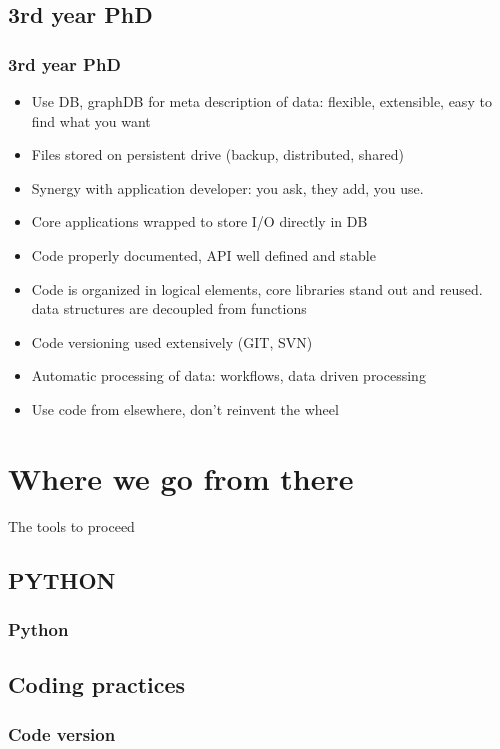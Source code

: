 \documentclass[14pt]{beamer}
\begin{document}
\subsection{3rd year PhD}
\begin{frame}
\frametitle{3rd year PhD}
\begin{itemize}
\item Use DB, graphDB for meta description of data: flexible, extensible, easy to find what you want
\item Files stored on persistent drive (backup, distributed, shared)
\item Synergy with application developer: you ask, they add, you use.
\item Core applications wrapped to store I/O directly in DB
\item Code properly documented, API well defined and stable
\end{itemize}
\end{frame}

\begin{frame}
\begin{itemize}
\item Code is organized in logical elements, core libraries stand out and reused. data structures are decoupled from functions
\item Code versioning used extensively (GIT, SVN)
\item Automatic processing of data: workflows, data driven processing
\item Use code from elsewhere, don't reinvent the wheel
\end{itemize}
\end{frame}

\section{Where we go from there}
\begin{frame}
The tools to proceed
\end{frame}

\subsection{PYTHON}
\begin{frame}
\frametitle{Python}
\end{frame}

\subsection{Coding practices}
\begin{frame}
\frametitle{Code version}
\end{frame}
\end{document}
